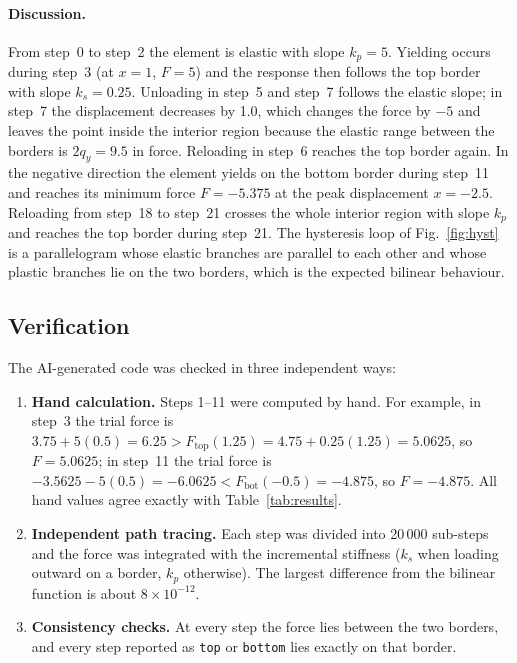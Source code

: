 \documentclass[11pt,a4paper]{article}
\begin{document}
\paragraph{Discussion.}
From step~0 to step~2 the element is elastic with slope $k_p = 5$. Yielding occurs during step~3
(at $x = 1$, $F = 5$) and the response then follows the top border with slope $k_s = 0.25$.
Unloading in step~5 and step~7 follows the elastic slope; in step~7 the displacement decreases by
1.0, which changes the force by $-5$ and leaves the point inside the interior region because the
elastic range between the borders is $2q_y = 9.5$ in force. Reloading in step~6 reaches the top
border again. In the negative direction the element yields on the bottom border during step~11
and reaches its minimum force $F = -5.375$ at the peak displacement $x = -2.5$. Reloading from
step~18 to step~21 crosses the whole interior region with slope $k_p$ and reaches the top border
during step~21. The hysteresis loop of Fig.~\ref{fig:hyst} is a parallelogram whose elastic
branches are parallel to each other and whose plastic branches lie on the two borders, which is
the expected bilinear behaviour.

\subsection{Verification}
The AI-generated code was checked in three independent ways:
\begin{enumerate}
  \item \textbf{Hand calculation.} Steps 1--11 were computed by hand. For example, in step~3 the
        trial force is $3.75 + 5(0.5) = 6.25 > F_{\text{top}}(1.25) = 4.75 + 0.25(1.25) = 5.0625$,
        so $F = 5.0625$; in step~11 the trial force is $-3.5625 - 5(0.5) = -6.0625 <
        F_{\text{bot}}(-0.5) = -4.875$, so $F = -4.875$. All hand values agree exactly with
        Table~\ref{tab:results}.
  \item \textbf{Independent path tracing.} Each step was divided into 20\,000 sub-steps and the
        force was integrated with the incremental stiffness ($k_s$ when loading outward on a border,
        $k_p$ otherwise). The largest difference from the bilinear function is about
        $8\times10^{-12}$.
  \item \textbf{Consistency checks.} At every step the force lies between the two borders, and
        every step reported as \texttt{top} or \texttt{bottom} lies exactly on that border.
\end{enumerate}
\end{document}
